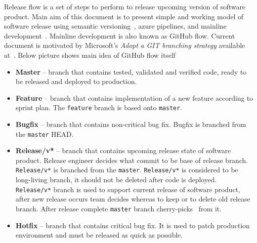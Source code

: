 Release flow is a set of steps to perform to release upcoming version of software product.
Main aim of this document is to present simple and working model of software release
using semantic versioning~\cite{SemanticVersioning}, azure pipelines,
and mainline development~\cite{MainlineDevelopment}.
Mainline development is also known as GitHub flow.
Current document is motivated by Microsoft's
\textit{Adopt a GIT branching strategy} available at~\cite{AdoptGitStrategy}.
Below picture shows main idea of GitHub flow itself

\begin{itemize}
    \item \textbf{Master} -- branch that contains tested, validated and verified code, ready to be released and deployed to production.
    \item \textbf{Feature} -- branch that contains implementation of a new feature according to sprint plan.
    The \texttt{feature} branch is based onto \texttt{master}.
    \item \textbf{Bugfix} -- branch that contains non-critical bug fix.
    Bugfix is branched from the \texttt{master} HEAD\@.
    \item \textbf{Release/v*} -- branch that contains upcoming release state of software product.
    Release engineer decides what commit to be base of release branch.
    \texttt{Release/v*} is branched from the \texttt{master}.
    \texttt{Release/v*} is considered to be long-living branch, it should not be deleted after code is deployed.
    \texttt{Release/v*} branch is used to support current release of software product, after new release occurs
    team decides whereas to keep or to delete old release branch.
    After release complete \texttt{master} branch cherry-picks~\cite{CherryPick} from it.
    \item \textbf{Hotfix} -- branch that contains critical bug fix.
    It is used to patch production environment and must be released as quick as possible.
\end{itemize}

